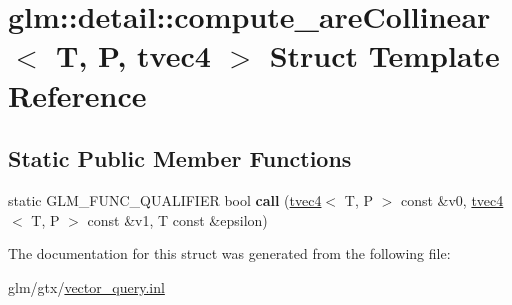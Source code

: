 \hypertarget{structglm_1_1detail_1_1compute__areCollinear_3_01T_00_01P_00_01tvec4_01_4}{\section{glm\-:\-:detail\-:\-:compute\-\_\-are\-Collinear$<$ T, P, tvec4 $>$ Struct Template Reference}
\label{structglm_1_1detail_1_1compute__areCollinear_3_01T_00_01P_00_01tvec4_01_4}
}
\subsection*{Static Public Member Functions}
\begin{DoxyCompactItemize}
\item 
\hypertarget{structglm_1_1detail_1_1compute__areCollinear_3_01T_00_01P_00_01tvec4_01_4_a614f1eb934d5e74a6585898a059cf5a0}{static G\-L\-M\-\_\-\-F\-U\-N\-C\-\_\-\-Q\-U\-A\-L\-I\-F\-I\-E\-R bool {\bfseries call} (\hyperlink{structglm_1_1tvec4}{tvec4}$<$ T, P $>$ const \&v0, \hyperlink{structglm_1_1tvec4}{tvec4}$<$ T, P $>$ const \&v1, T const \&epsilon)}\label{structglm_1_1detail_1_1compute__areCollinear_3_01T_00_01P_00_01tvec4_01_4_a614f1eb934d5e74a6585898a059cf5a0}

\end{DoxyCompactItemize}


The documentation for this struct was generated from the following file\-:\begin{DoxyCompactItemize}
\item 
glm/gtx/\hyperlink{vector__query_8inl}{vector\-\_\-query.\-inl}\end{DoxyCompactItemize}

